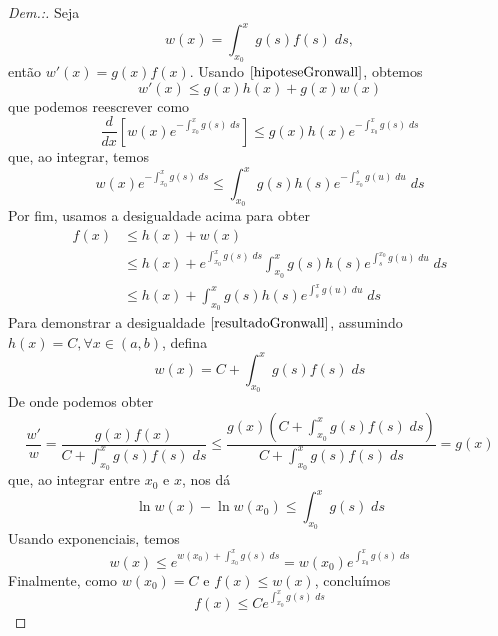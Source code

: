 \begin{proof}[Dem.:]
    Seja
    \begin{equation}
        w(x) = \int_{x_0}^x g(s)f(s) \; ds,
    \end{equation}
    então $w'(x)=g(x)f(x)$. Usando $\eqref{hipoteseGronwall}$, obtemos
    \begin{equation}
        w'(x) \leq g(x)h(x) + g(x)w(x)
    \end{equation}
    que podemos reescrever como
    \begin{equation}
        \frac{d}{dx}\left[w(x)e^{-\int_{x_0}^x g(s)\; ds}\right] \leq g(x)h(x)e^{-\int_{x_0}^x g(s)\; ds}
    \end{equation}
    que, ao integrar, temos
    \begin{equation}
        w(x)e^{-\int_{x_0}^x g(s)\; ds} \leq \int_{x_0}^x g(s)h(s)e^{-\int_{x_0}^s g(u)\; du}\; ds
    \end{equation}
    Por fim, usamos a desigualdade acima para obter
    \begin{equation}
    \begin{split}
        f(x) &\leq h(x) + w(x) \\
        &\leq h(x) + e^{\int_{x_0}^x g(s)\; ds}\int_{x_0}^x g(s)h(s)e^{\int_{s}^{x_0} g(u)\; du}\; ds \\
        &\leq h(x) + \int_{x_0}^x g(s)h(s)e^{\int_{s}^{x} g(u)\; du}\; ds
    \end{split}
    \end{equation}
    Para demonstrar a desigualdade $\eqref{resultadoGronwall}$, assumindo $h(x)=C,\forall x\in(a,b)$, defina
    \begin{equation}
        w(x)=C + \int_{x_0}^x g(s)f(s) \; ds
    \end{equation}
    De onde podemos obter
    \begin{equation}
        \frac{w'}{w}=\frac{g(x)f(x)}{C+\int_{x_0}^x g(s)f(s)\; ds} \leq \frac{g(x)\left( C+\int_{x_0}^x g(s)f(s)\; ds\right)}{C+\int_{x_0}^x g(s)f(s)\; ds} = g(x)
    \end{equation}
    que, ao integrar entre $x_0$ e $x$, nos dá
    \begin{equation}
        \ln{w(x)} - \ln{w(x_0)} \leq \int_{x_0}^x g(s) \; ds
    \end{equation}
    Usando exponenciais, temos
    \begin{equation}
        w(x) \leq e^{w(x_0)+\int_{x_0}^x g(s) \; ds} = w(x_0)e^{\int_{x_0}^x g(s) \; ds}
    \end{equation}
    Finalmente, como $w(x_0)=C$ e $f(x)\leq w(x)$, concluímos
    \begin{equation}
        f(x) \leq Ce^{\int_{x_0}^x g(s) \; ds}
    \end{equation}
\end{proof}

